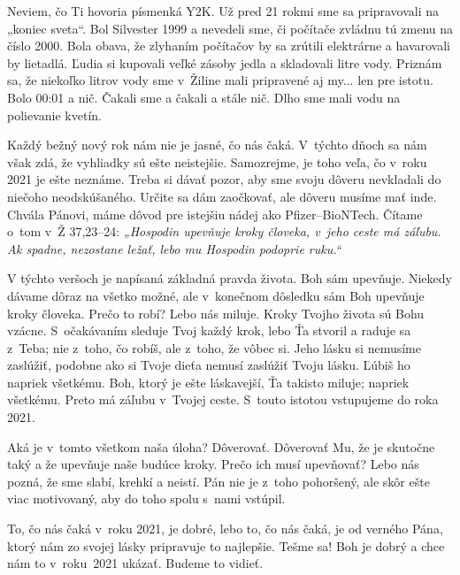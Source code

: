 


Neviem, čo Ti  hovoria písmenká Y2K. Už pred 21 rokmi sme sa pripravovali na „koniec sveta“. Bol Silvester 1999 a nevedeli sme, či počítače zvládnu tú zmenu na číslo 2000. Bola obava, že zlyhaním počítačov by sa zrútili elektrárne a havarovali by lietadlá. Ľudia si kupovali veľké zásoby jedla a skladovali litre vody. Priznám sa, že niekoľko litrov vody sme v~Žiline mali pripravené aj my... len pre istotu. Bolo 00:01 a nič. Čakali sme a čakali a stále nič. Dlho sme mali vodu na polievanie kvetín.

Každý bežný nový rok nám nie je jasné, čo nás čaká. V~týchto dňoch sa nám však zdá, že vyhliadky sú ešte neistejšie. Samozrejme, je toho veľa, čo v~roku 2021 je ešte neznáme. Treba si dávať pozor, aby sme svoju dôveru nevkladali do niečoho neodskúšaného. Určite sa dám zaočkovať, ale dôveru musíme mať inde. Chvála Pánovi, máme dôvod pre istejšiu nádej ako Pfizer--BioNTech. Čítame o~tom v~Ž 37,23--24: {\it „Hospodin upevňuje kroky človeka, v~jeho ceste má záľubu. Ak spadne, nezostane ležať, lebo mu Hospodin podoprie ruku.“}

V týchto veršoch je napísaná základná pravda života. Boh sám upevňuje. Niekedy dávame dôraz na všetko možné, ale v~konečnom dôsledku sám Boh upevňuje kroky človeka. Prečo to robí? Lebo nás miluje. Kroky Tvojho života sú Bohu vzácne. S~očakávaním sleduje Tvoj každý krok, lebo Ťa stvoril a raduje sa z~Teba; nie z~toho, čo robíš, ale z~toho, že vôbec si. Jeho lásku si nemusíme zaslúžiť, podobne ako si Tvoje dieťa nemusí zaslúžiť Tvoju lásku. Ľúbiš ho napriek všetkému. Boh, ktorý je ešte láskavejší, Ťa takisto miluje; napriek všetkému. Preto má záľubu v~Tvojej ceste. S~touto istotou vstupujeme do roka 2021.

Aká je v~tomto všetkom naša úloha? Dôverovať. Dôverovať Mu, že je skutočne taký a že upevňuje naše budúce kroky. Prečo ich musí upevňovať? Lebo nás pozná, že sme slabí, krehkí a neistí. Pán nie je z~toho pohoršený, ale skôr ešte viac motivovaný, aby do toho spolu s~nami vstúpil.

To, čo nás čaká v~roku 2021, je dobré, lebo to, čo nás čaká, je od verného Pána, ktorý nám zo svojej lásky pripravuje to najlepšie. Tešme sa! Boh je dobrý a chce nám to v~roku~2021 ukázať. Budeme to vidieť.

